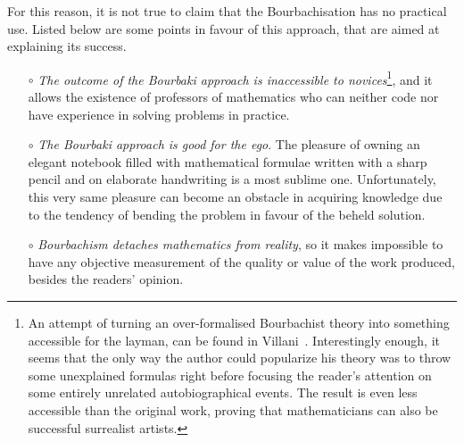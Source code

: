 \documentclass[]{scrartcl}
\theoremstyle{definition}
\begin{document}
For this reason, it is not true to claim that the Bourbachisation has no practical use. Listed below are some points in favour of this approach, that are aimed at explaining its success.

\begin{itemize}
    \item[$\circ$] \emph{The outcome of the Bourbaki approach is inaccessible to novices}\footnote{
        An attempt of turning an over-formalised Bourbachist theory into something accessible for the layman, can be found in Villani~\cite{villani2003livingtheorem}. Interestingly enough, it seems that the only way the author could popularize his theory was to throw some unexplained formulas right before focusing the reader's attention on some entirely unrelated autobiographical events. The result is even less accessible than the original work, proving that mathematicians can also be successful surrealist artists.
    }, and it allows the existence of professors of mathematics who can neither code nor have experience in solving problems in practice.

    \item[$\circ$] \emph{The Bourbaki approach is good for the ego}. The pleasure of owning an elegant notebook filled with mathematical formulae written with a sharp pencil and on elaborate handwriting is a most sublime one. Unfortunately, this very same pleasure can become an obstacle in acquiring knowledge due to the tendency of bending the problem in favour of the beheld solution.

    \item[$\circ$] \emph{Bourbachism detaches mathematics from reality}, so it makes impossible to have any objective measurement of the quality or value of the work produced, besides the readers' opinion.


\end{itemize}
\end{document}
